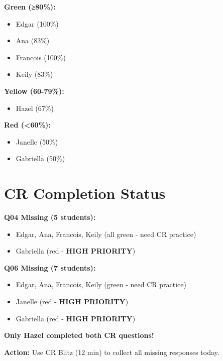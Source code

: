 \documentclass[11pt]{article}
\begin{document}
\begin{tcolorbox}[colback=green!5!white,colframe=green!75!black,title=\textbf{Traffic Light Status (MC Performance)}]
\begin{multicols}{3}
\textbf{Green (≥80\%):}
\begin{itemize}[leftmargin=*]
    \item Edgar (100\%)
    \item Ana (83\%)
    \item Francois (100\%)
    \item Keily (83\%)
\end{itemize}

\columnbreak

\textbf{Yellow (60-79\%):}
\begin{itemize}[leftmargin=*]
    \item Hazel (67\%)
\end{itemize}

\columnbreak

\textbf{Red (<60\%):}
\begin{itemize}[leftmargin=*]
    \item Janelle (50\%)
    \item Gabriella (50\%)
\end{itemize}
\end{multicols}
\end{tcolorbox}

\vspace{0.15in}

\section*{CR Completion Status}

\begin{tcolorbox}[colback=yellow!10!white,colframe=orange!75!black,title=\textbf{Missing CR Responses - PRIORITY}]

\textbf{Q04 Missing (5 students):}
\begin{itemize}[leftmargin=*]
    \item Edgar, Ana, Francois, Keily (all green - need CR practice)
    \item Gabriella (red - \textbf{HIGH PRIORITY})
\end{itemize}

\textbf{Q06 Missing (7 students):}
\begin{itemize}[leftmargin=*]
    \item Edgar, Ana, Francois, Keily (green - need CR practice)
    \item Janelle (red - \textbf{HIGH PRIORITY})
    \item Gabriella (red - \textbf{HIGH PRIORITY})
\end{itemize}

\textbf{Only Hazel completed both CR questions!}

\textbf{Action:} Use CR Blitz (12 min) to collect all missing responses today.
\end{tcolorbox}
\end{document}
